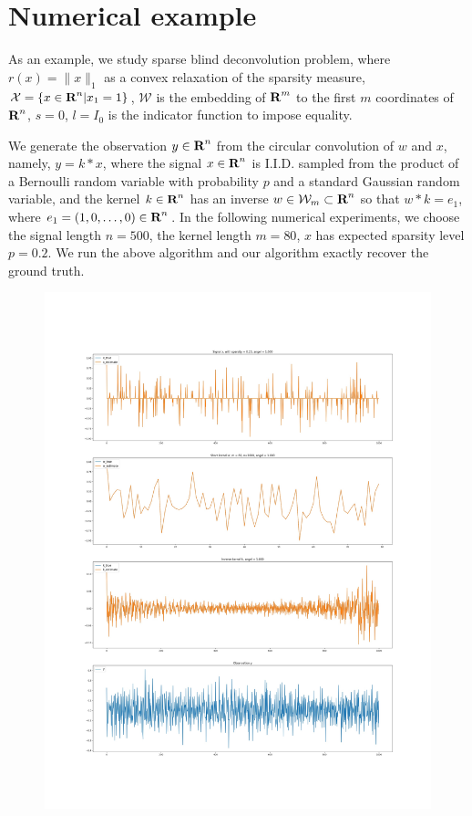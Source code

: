 \documentclass[12pt]{article}
\begin{document}
\section{Numerical example}
 As an example, we study sparse blind deconvolution problem, where  
 $r(x) = \|x\|_1$ as a convex relaxation of the sparsity measure, $\mathcal X = \{x\in {\mbox{\bf R}}^n| x_1=1\}$,
 $\mathcal W$ is the embedding of ${\mbox{\bf R}}^m$ to the first $m$ coordinates of ${\mbox{\bf R}}^n$, $s=0$, $l=I_{0}$ is the indicator function to impose equality.

We generate the observation $y\in {\mbox{\bf R}}^n$ from the circular convolution of $w$ and $x$, namely,  $y = k*x$, 
where the signal $x\in {\mbox{\bf R}}^n$ is I.I.D. sampled from the product of a Bernoulli random variable with probability $p$ and a standard Gaussian random variable,
 and the kernel $k\in {\mbox{\bf R}}^n$ has an inverse $w\in \mathcal W_m \subset {\mbox{\bf R}}^n$ so that $w*k = e_1$,
  where $e_1=(1,0,\ldots, 0)\in {\mbox{\bf R}}^n$. 
  In the following numerical experiments, we choose the signal length $n=500$, the kernel length $m= 80$, $x$ has expected sparsity level $p=0.2$. 
  We run the above algorithm and our algorithm exactly recover the ground truth.
\begin{figure}
 \includegraphics[width=12cm,keepaspectratio]{figures/bShort_lenKnown_xSparse_w_Gaus_Ano_n1000_k80_p0_20_sigma0_00.jpg}
\end{figure}
 
\end{document}
